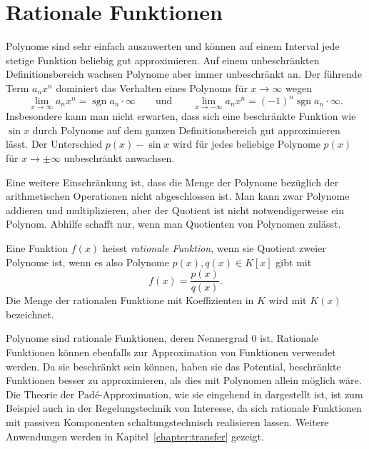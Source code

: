 %
%
%
\section{Rationale Funktionen
\label{buch:polynome:section:rationale-funktionen}}
Polynome sind sehr einfach auszuwerten und können auf einem
Interval jede stetige Funktion beliebig gut approximieren.
Auf einem unbeschränkten Definitionsbereich wachsen Polynome aber
immer unbeschränkt an.
Der führende Term $a_nx^n$ dominiert das Verhalten eines Polynoms
für $x\to\infty$ wegen
\[
\lim_{x\to\infty} a_nx^n
=
\operatorname{sgn} a_n \cdot\infty
\qquad\text{und}\qquad
\lim_{x\to-\infty} a_nx^n
=
(-1)^n \operatorname{sgn} a_n\cdot \infty.
\]
Insbesondere kann man nicht erwarten, dass sich eine beschränkte
Funktion wie $\sin x$ durch Polynome auf dem ganzen Definitionsbereich
gut approximieren lässt.
Der Unterschied $p(x)-\sin x$ wird für jedes beliebige Polynome $p(x)$
für $x\to\pm\infty$ unbeschränkt anwachsen.

Eine weitere Einschränkung ist, dass die Menge der Polynome bezüglich
der arithmetischen Operationen nicht abgeschlossen ist.
Man kann zwar Polynome addieren und multiplizieren, aber der Quotient
ist nicht notwendigerweise ein Polynom.
Abhilfe schafft nur, wenn man Quotienten von Polynomen zulässt.

\begin{definition}
Eine Funktion $f(x)$ heisst {\em rationale Funktion}, wenn sie Quotient
%
zweier Polynome ist, wenn es also Polynome $p(x), q(x)\in K[x]$ gibt mit
\[
f(x) = \frac{p(x)}{q(x)}.
\]
Die Menge der rationalen Funktione mit Koeffizienten in $K$ wird mit
$K(x)$ bezeichnet.
\end{definition}

Polynome sind rationale Funktionen, deren Nennergrad $0$ ist.
Rationale Funktionen können ebenfalls zur Approximation von Funktionen
verwendet werden.
Da sie beschränkt sein können, haben sie das Potential, 
beschränkte Funktionen besser zu approximieren, als dies mit 
Polynomen allein möglich wäre.
Die Theorie der Padé-Approximation, wie sie eingehend in
%
\cite{buch:pade} dargestellt ist, ist zum Beispiel auch in der
Regelungstechnik von Interesse, da sich rationale Funktionen mit
passiven Komponenten schaltungstechnisch realisieren lassen.
Weitere Anwendungen werden in Kapitel~\ref{chapter:transfer}
gezeigt.


